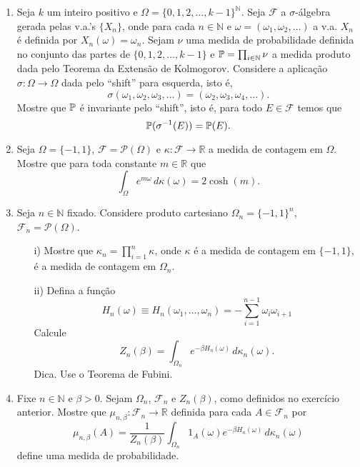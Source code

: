 \begin{enumerate}[leftmargin=*]
\item
Seja $k$ um inteiro positivo e 
$\Omega=\{0,1,2,\ldots,k-1\}^{\mathbb{N}}$. 
Seja $\mathcal{F}$ a $\sigma$-álgebra gerada 
pelas v.a.'s $\{X_n\}$, onde para 
cada $n\in\mathbb{N}$ e $\omega=(\omega_1,\omega_2,\ldots)$ 
a v.a. $X_n$ é definida por $X_n(\omega)=\omega_n$. 
Sejam $\nu$ uma medida de probabilidade definida no conjunto das partes
de $\{0,1,2,\ldots,k-1\}$ e $\P = \prod_{i\in\mathbb{N}}\nu$ 
a medida produto dada pelo Teorema da Extensão de Kolmogorov.
Considere a aplicação $\sigma:\Omega\to\Omega$ 
dada pelo ``shift'' para esquerda, isto é, 
	\[
		\sigma(\omega_1,\omega_2,\omega_3,\ldots)
		=
		(\omega_2,\omega_3,\omega_4,\ldots).
	\] 
Mostre que $\P$ é invariante pelo ``shift'', isto é, 
para todo $E\in\mathcal{F}$ temos que 
	\[
	\P(\sigma^{-1}(E)) = \P(E).
	\] 











\item
Seja $\Omega=\{-1,1\}$, $\mathcal{F}=\mathcal{P}(\Omega)$ e 
$\kappa:\mathcal{F}\to \mathbb{R}$ 
a medida de contagem em $\Omega$.
Mostre que para toda constante $m\in\mathbb{R}$ que
\[
	\int_{\Omega} e^{m\omega}\, d\kappa(\omega)
	=
	2\cosh(m).
\]


\item 
Seja $n\in\mathbb{N}$ fixado. 
Considere produto cartesiano $\Omega_n=\{-1,1\}^n$, 
$\mathcal{F}_n=\mathcal{P}(\Omega)$.

	\begin{itemize}

		\item[i)]
		Mostre que  
		$\kappa_n = \prod_{i=1}^n \kappa$, 
		onde $\kappa$ é a medida de contagem em $\{-1,1\}$, 
		é a medida de contagem em $\Omega_n$.
		
		
		\item[ii)]
		Defina a função 
		\[
			H_n(\omega)
			\equiv
			H_n(\omega_1,\ldots,\omega_n)
			= 
			-\sum_{i=1}^{n-1} \omega_i\omega_{i+1}
		\]
		Calcule
		\[
			Z_n(\beta)
			=
			\int_{\Omega_n} 
			e^{-\beta H_n(\omega)}\, 
			d\kappa_n(\omega).
			\]
		Dica. Use o Teorema de Fubini.		
		\end{itemize}





\item 
Fixe $n\in\mathbb{N}$ e $\beta>0$. Sejam 
$\Omega_n$, $\mathcal{F}_n$ e $Z_n(\beta)$,
como definidos no exercício anterior. 
Mostre que $\mu_{n,\beta}:\mathcal{F}_n\to\mathbb{R}$
definida para cada $A\in \mathcal{F}_n$ por 
\[
	\mu_{n,\beta}(A)
	=	
	\frac{1}{Z_{n}(\beta)}
	\int_{\Omega_n} 
	1_{A}(\omega)
	e^{-\beta H_n(\omega)}\, 
	d\kappa_n(\omega)
\]
define uma medida de probabilidade.












\end{enumerate}
